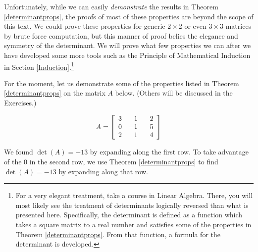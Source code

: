 \documentclass{ximera}
\begin{document}

 

Unfortunately, while we can easily \textit{demonstrate} the results in Theorem \ref{determinantprops}, the proofs of most of these properties are beyond the scope of this text.  We could prove these properties for generic $2 \times 2$ or even $3 \times 3$ matrices by brute force computation, but this manner of proof belies the elegance and symmetry of the determinant.  We will prove what few properties we can after we have developed some more tools such as the Principle of Mathematical Induction in Section \ref{Induction}.\footnote{For a very elegant treatment, take a course in Linear Algebra.  There, you will most likely see the treatment of determinants logically reversed than what is presented here.  Specifically, the determinant is defined as a function which takes a square matrix to a real number and satisfies some of the properties in Theorem \ref{determinantprops}. From that function, a formula for the determinant is developed.}  

For the moment, let us demonstrate some of the properties listed in Theorem \ref{determinantprops} on the matrix $A$ below.  (Others will be discussed in the Exercises.)

\[A =  \left[ \begin{array}{rrr} 3 & 1 & \hphantom{-}2 \\ 0 & -1 & 5 \\ 2 & 1 & 4 \\ \end{array} \right] \]

We found $\det(A) = -13$ by expanding along the first row.  To take advantage of the $0$ in the second row, we use Theorem \ref{determinantprops} to find $\det(A) = -13$ by expanding along that row.
\end{document}
